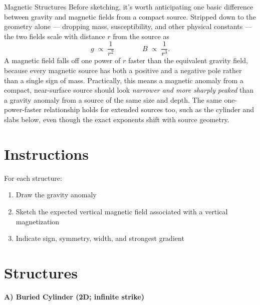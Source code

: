 \begin{activity}{Magnetic Structures}
Before sketching, it's worth anticipating one basic difference between gravity and magnetic fields from a compact source. Stripped down to the geometry alone --- dropping mass, susceptibility, and other physical constants --- the two fields scale with distance $r$ from the source as
\[
    g \;\propto\; \frac{1}{r^2}
    \qquad\qquad
    B \;\propto\; \frac{1}{r^3}.
\]
A magnetic field falls off one power of $r$ faster than the equivalent gravity field, because every magnetic source has both a positive and a negative pole rather than a single sign of mass. Practically, this means a magnetic anomaly from a compact, near-surface source should look \emph{narrower and more sharply peaked} than a gravity anomaly from a source of the same size and depth. The same one-power-faster relationship holds for extended sources too, such as the cylinder and slabs below, even though the exact exponents shift with source geometry.

\section*{Instructions}

For each structure:
\begin{enumerate}
  \item Draw the gravity anomaly
  \item Sketch the expected vertical magnetic field associated with a vertical magnetization
  \item Indicate sign, symmetry, width, and strongest gradient
\end{enumerate}

\section*{Structures}

\begin{center}
\textbf{A) Buried Cylinder (2D; infinite strike)}
\end{center}

\bax

\begin{center}
\end{center}


\end{activity}
